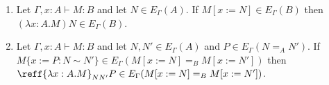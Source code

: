 \begin{lemma}
\begin{enumerate}
\begin{code}
\end{code}
\item
\label{lm:wteT}
Let $\Gamma, x : A \vdash M : B$ and let $N \in E_\Gamma(A)$. If $M[x:=N] \in E_\Gamma(B)$ then $(\lambda x:A.M)N \in E_\Gamma(B)$.
\item
\label{lm:wteE'}
Let $\Gamma, x : A \vdash M : B$ and let $N, N' \in E_\Gamma(A)$ and $P \in E_\Gamma(N =_A N')$.
If $M \{ x := P : N \sim N' \} \in E_\Gamma(M[x:=N] =_B M[x:=N'])$ then $\reff{\lambda x:A.M}_{N N'} P \in E_\Gamma(M[x:=N] =_B M[x:=N'])$.
\begin{code}%
\>  \AgdaSymbol{:}  \AgdaSymbol{\{}\AgdaSymbol{\}} \AgdaSymbol{\{} \AgdaSymbol{:}  \AgdaSymbol{\}} \AgdaSymbol{\{}     \AgdaSymbol{\}}             \AgdaSymbol{(} \AgdaSymbol{)}     \AgdaSymbol{(} \AgdaSymbol{)}     \AgdaSymbol{(}    \AgdaSymbol{)}  \<%
\\
\>[15]\<[16]%
\>[16]  \AgdaSymbol{(}            \AgdaSymbol{)} \AgdaSymbol{(}  \AgdaSymbol{(} \AgdaSymbol{)}  \AgdaSymbol{(} \AgdaSymbol{)}  \AgdaSymbol{(} \AgdaSymbol{)} \AgdaSymbol{)} \<%
\\
\>[15]\<[16]%
\>[16]  \AgdaSymbol{(}            \AgdaSymbol{)} \AgdaSymbol{(}   \AgdaSymbol{(} \AgdaSymbol{(}  \AgdaSymbol{))} \AgdaSymbol{)}\<%
\end{code}
\end{enumerate}
\end{lemma}

